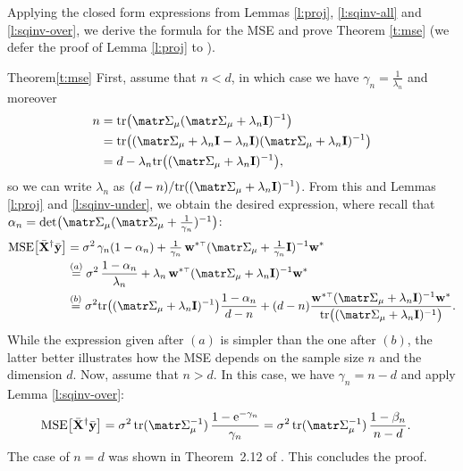 \documentclass[../../thesis.tex]{subfiles}
\begin{document}
Applying the closed form expressions from Lemmas
\ref{l:proj}, \ref{l:sqinv-all} and \ref{l:sqinv-over}, we derive
the formula for the MSE and prove Theorem \ref{t:mse} (we defer the
proof of Lemma \ref{l:proj} to ).
\begin{proofof}{Theorem}{\ref{t:mse}}
  First, assume that $n<d$, in which case we have
  $\gamma_n=\frac1{\lambda_n}$ and moreover
  \begin{align*}
    n & = \tr\big(\Sigmab_\mu(\Sigmab_\mu+\lambda_n\I)^{-1}\big)                          \\
      & =\tr\big((\Sigmab_\mu+\lambda_n\I-\lambda_n\I)(\Sigmab_\mu+\lambda_n\I)^{-1}\big) \\
      & =d - \lambda_n\tr\big((\Sigmab_\mu+\lambda_n\I)^{-1}\big),
  \end{align*}
  so we can write $\lambda_n$ as $(d-n)/\tr((\Sigmab_\mu+\lambda_n\I)^{-1})$.
  From this and Lemmas \ref{l:proj} and \ref{l:sqinv-under}, we
  obtain the desired expression, where recall
  that $\alpha_n = \det\!\big(\Sigmab_\mu (\Sigmab_\mu+\frac1{\gamma_n})^{-1}\big)$:
  \begin{align*}
    \MSE{\Xb^\dagger\ybb} & = \sigma^2\,\gamma_n(1-\alpha_n) +
    \tfrac1{\gamma_n} \,\w^{*\top}(\Sigmab_\mu+\tfrac1{\gamma_n}\I)^{-1}\w^*
    \\
                          & \overset{(a)}{=}\sigma^2\,\frac{1-\alpha_n}{\lambda_n} +
    \lambda_n\,\w^{*\top}(\Sigmab_\mu+\lambda_n\I)^{-1}\w^*                                                           \\
                          & \overset{(b)}{=}\sigma^2\tr\big((\Sigmab_\mu+\lambda_n\I)^{-1}\big)\frac{1-\alpha_n}{d-n}
    +
    (d-n)\frac{\w^{*\top}(\Sigmab_\mu+\lambda_n\I)^{-1}\w^*}
    {\tr\big((\Sigmab_\mu+\lambda_n\I)^{-1}\big)}.
  \end{align*}
  While the expression given after $(a)$ is simpler than the one
  after $(b)$, the latter better illustrates how the MSE depends on
  the sample size $n$ and the dimension $d$.
  Now, assume that $n>d$. In this case, we have $\gamma_n=n-d$ and apply Lemma
  \ref{l:sqinv-over}:
  \begin{align*}
    \MSE{\Xb^\dagger\ybb}
     & = \sigma^2\,\tr(\Sigmab_\mu^{-1})\,
    \frac{1-\ee^{-\gamma_n}}{\gamma_n}
    =\sigma^2\,\tr(\Sigmab_\mu^{-1})
    \,\frac{1-\beta_n}{n-d}.
  \end{align*}
  The case of $n=d$ was shown in Theorem~2.12 of \cite{correcting-bias-journal}.
  This concludes the proof.
\end{proofof}
\end{document}
